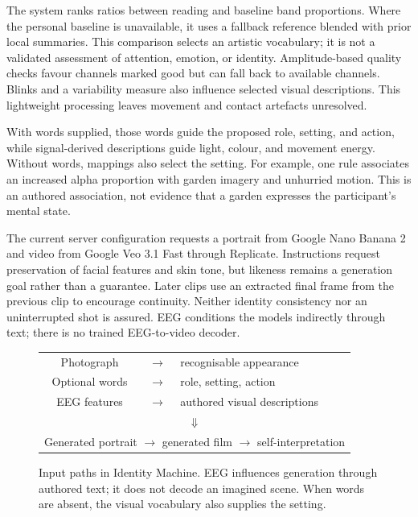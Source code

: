 \documentclass[manuscript,screen,nonacm]{acmart}
\begin{document}
The system ranks ratios between reading and baseline band proportions. Where the personal baseline is unavailable, it uses a fallback reference blended with prior local summaries. This comparison selects an artistic vocabulary; it is not a validated assessment of attention, emotion, or identity. Amplitude-based quality checks favour channels marked good but can fall back to available channels. Blinks and a variability measure also influence selected visual descriptions. This lightweight processing leaves movement and contact artefacts unresolved.

With words supplied, those words guide the proposed role, setting, and action, while signal-derived descriptions guide light, colour, and movement energy. Without words, mappings also select the setting. For example, one rule associates an increased alpha proportion with garden imagery and unhurried motion. This is an authored association, not evidence that a garden expresses the participant's mental state.

The current server configuration requests a portrait from Google Nano Banana 2 and video from Google Veo 3.1 Fast through Replicate. Instructions request preservation of facial features and skin tone, but likeness remains a generation goal rather than a guarantee. Later clips use an extracted final frame from the previous clip to encourage continuity. Neither identity consistency nor an uninterrupted shot is assured. EEG conditions the models indirectly through text; there is no trained EEG-to-video decoder.

\begin{figure}[ht]
\centering
\small
\begin{tabular}{ccl}
Photograph & $\longrightarrow$ & recognisable appearance\\
Optional words & $\longrightarrow$ & role, setting, action\\
EEG features & $\longrightarrow$ & authored visual descriptions\\[3pt]
\multicolumn{3}{c}{$\Downarrow$}\rule{0pt}{12pt}\\
\multicolumn{3}{c}{Generated portrait $\longrightarrow$ generated film $\longrightarrow$ self-interpretation}
\end{tabular}
\caption{Input paths in Identity Machine. EEG influences generation through authored text; it does not decode an imagined scene. When words are absent, the visual vocabulary also supplies the setting.}
\end{figure}
\end{document}
